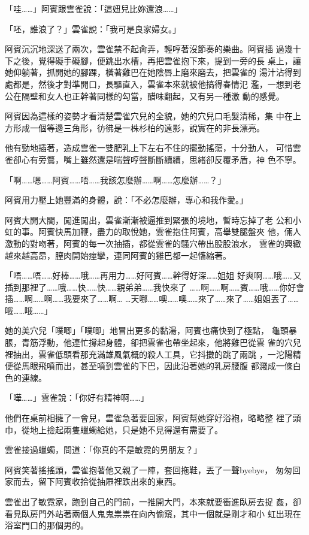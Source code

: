 「哇……」阿賓跟雲雀說：「這妞兒比妳還浪……」

「呸，誰浪了？」雲雀說：「我可是良家婦女。」

阿賓沉沉地深送了兩次，雲雀禁不起肏弄，輕哼著沒節奏的樂曲。阿賓插
過幾十下之後，覺得礙手礙腳，便跳出水槽，再把雲雀抱下來，提到一旁的長
桌上，讓她仰躺著，抓開她的腳踝，橫著雞巴在她陰唇上磨來磨去，把雲雀的
湯汁沾得到處都是，然後才對準開口，長驅直入，雲雀本來就被他搞得春情氾
濫，一想到老公在隔壁和女人也正幹著同樣的勾當，醋味翻起，又有另一種激
動的感覺。

阿賓因為這樣的姿勢才看清楚雲雀穴兒的全貌，她的穴兒口毛髮清稀，集
中在上方形成一個等邊三角形，彷彿是一株杉柏的遠影，說實在的非長漂亮。

他有勁地插著，造成雲雀一雙肥乳上下左右不住的擺動搖蕩，十分動人，
可惜雲雀卻心有旁鶩，嘴上雖然還是喘聲哼聲斷斷續續，思緒卻反覆矛盾，神
色不寧。

「啊……嗯……阿賓……唔……我該怎麼辦……啊……怎麼辦……？」

阿賓用力壓上她豐滿的身體，說：「不必怎麼辦，專心和我作愛。」

阿賓大開大閤，闖進闖出，雲雀漸漸被逼推到緊張的境地，暫時忘掉了老
公和小虹的事。阿賓快馬加鞭，盡力的取悅她，雲雀抱住阿賓，高舉雙腿盤夾
他，倆人激動的對吻著，阿賓的每一次抽插，都從雲雀的騷穴帶出股股浪水，
雲雀的興緻越來越高昂，膣肉開始痙攣，連同阿賓的雞巴都一起慉縮著。

「唔……唔……好棒……哦……再用力……好阿賓……幹得好深……姐姐
好爽啊……哦……又插到那裡了……哦……快……快……親弟弟……我快來了
……啊……啊……賓……哦……你好會插……啊……啊……我要來了……啊…
…天哪……噢……噢……來了……來了……姐姐丟了……哦……哦……」

她的美穴兒「噗唧」「噗唧」地冒出更多的黏湯，阿賓也痛快到了極點，
龜頭暴脹，青筋浮動，他連忙撐起身體，卻把雲雀也帶坐起來，他將雞巴從雲
雀的穴兒裡抽出，雲雀低頭看那充滿雄風氣概的殺人工具，它抖擻的跳了兩跳
，一沱陽精便從馬眼飛噴而出，甚至噴到雲雀的下巴，因此沿著她的乳房腰腹
都濺成一條白色的連線。

「嘩……」雲雀說：「你好有精神啊……」

他們在桌前相擁了一會兒，雲雀急著要回家，阿賓幫她穿好浴袍，略略整
裡了頭巾，從地上撿起兩隻蠟蠋給她，只是她不見得還有需要了。

雲雀接過蠟蠋，問道：「你真的不是敏霓的男朋友？」

阿賓笑著搖搖頭，雲雀抱著他又親了一陣，套回拖鞋，丟了一聲byebye，
匆匆回家而去，留下阿賓收拾從抽屜裡跌出來的東西。

雲雀出了敏霓家，跑到自己的門前，一推開大門，本來就要衝進臥房去捉
姦，卻看見臥房門外站著兩個人鬼鬼祟祟在向內偷窺，其中一個就是剛才和小
虹出現在浴室門口的那個男的。

